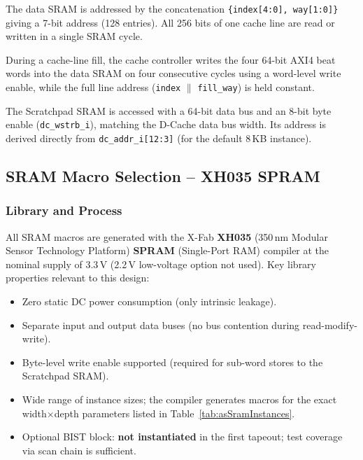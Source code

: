 The data SRAM is addressed by the concatenation \texttt{\{index[4:0], way[1:0]\}}
giving a 7-bit address (128 entries).
All 256 bits of one cache line are read or written in a single SRAM cycle.

During a cache-line fill, the cache controller writes the four 64-bit AXI4
beat words into the data SRAM on four consecutive cycles using a word-level
write enable, while the full line address (\texttt{index} $\parallel$
\texttt{fill\_way}) is held constant.

The Scratchpad SRAM is accessed with a 64-bit data bus and an 8-bit byte
enable (\texttt{dc\_wstrb\_i}), matching the D-Cache data bus width.
Its address is derived directly from \texttt{dc\_addr\_i[12:3]} (for the
default 8\,KB instance).

\subsection{SRAM Macro Selection -- XH035 SPRAM}
\label{subsec:sramSelection}

\subsubsection{Library and Process}

All SRAM macros are generated with the X-Fab \textbf{XH035}
(350\,nm Modular Sensor Technology Platform)
\textbf{SPRAM} (Single-Port RAM) compiler at the nominal supply of
3.3\,V (2.2\,V low-voltage option not used).
Key library properties relevant to this design:

\begin{itemize}
  \item Zero static DC power consumption (only intrinsic leakage).
  \item Separate input and output data buses (no bus contention during
    read-modify-write).
  \item Byte-level write enable supported (required for sub-word stores
    to the Scratchpad SRAM).
  \item Wide range of instance sizes; the compiler generates macros for
    the exact width$\times$depth parameters listed in
    Table~\ref{tab:asSramInstances}.
  \item Optional BIST block: \textbf{not instantiated} in the first
    tapeout; test coverage via scan chain is sufficient.
\end{itemize}


